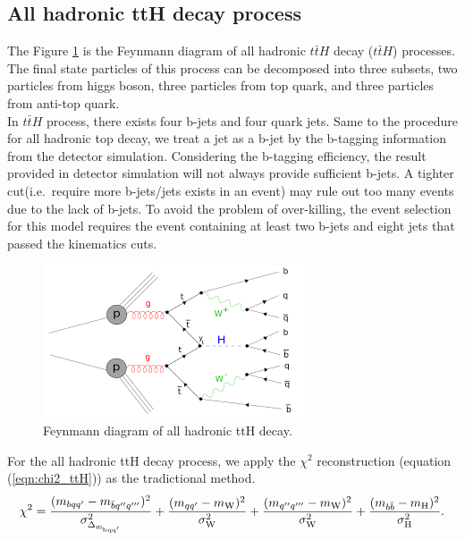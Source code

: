 \subsection{All hadronic ttH decay process}\label{subsec: ttH}
The Figure \ref{fig:ttH} is the Feynmann diagram of all hadronic $t\bar{t}H$ decay ($t\bar{t}H$) processes. The final state particles of this process can be decomposed into three subsets, two particles from higgs boson, three particles from top quark, and three particles from anti-top quark. 
\\
In $t\bar{t}H$ process, there exists four b-jets and four quark jets. Same to the procedure for all hadronic top decay, we treat a jet as a b-jet by the b-tagging information from the detector simulation. Considering the b-tagging efficiency, the result provided in detector simulation will not always provide sufficient b-jets. A tighter cut(i.e.~require more b-jets/jets exists in an event) may rule out too many events due to the lack of b-jets. To avoid the problem of over-killing, the event selection for this model requires the event containing at least two b-jets and eight jets that passed the kinematics cuts.
\\
\begin{figure}[H]
	\includegraphics[width=0.7\linewidth]{Figures/all-had_ttH.png}
	\caption{Feynmann diagram of all hadronic ttH decay\cite{CMS:2019kgw}.}
	\label{fig:ttH}
\end{figure}
For the all hadronic ttH decay process, we apply the $\chi^{2}$ reconstruction (equation (\ref{eqn:chi2_ttH})) as the tradictional method.
\\
\begin{equation}\label{eqn:chi2_ttH}
	\chi^{2} = \frac{(m_{bqq'} - m_{\bar{b}q''q'''})^{2}}{\sigma^{2}_{\Delta_{\rm m_{bqq'}}}}  + \frac{(m_{qq'} - m_{\rm W})^{2}}{\sigma^{2}_{\rm W}} + \frac{(m _{q''q'''} - m_{\rm W})^{2}}{\sigma^{2}_{\rm W}} + \frac{(m_{b\bar{b}} - m_{\rm H})^{2}}{\sigma_{\rm H}^{2}}.
\end{equation} 

